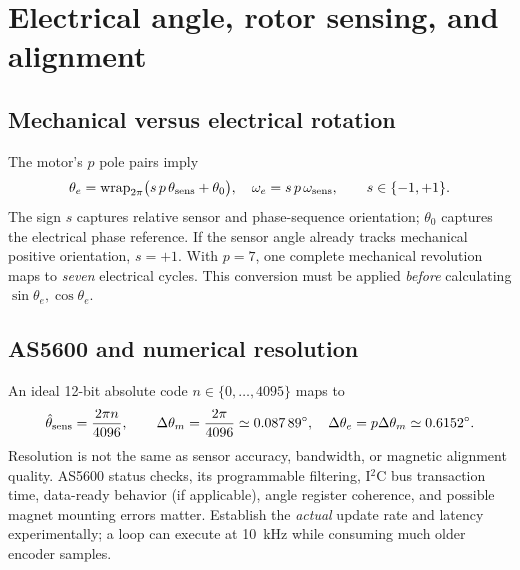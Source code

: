 \documentclass[10pt,letterpaper]{article}
\newcommand{\wrap}{\operatorname{wrap}_{2\pi}}
\begin{document}
\section{Electrical angle, rotor sensing, and alignment}
\subsection{Mechanical versus electrical rotation}
The motor's $p$ pole pairs imply
\begin{equation}\label{eq:angle}
\theta_e=\wrap\bigl(s\,p\,\theta_{\rm sens}+\theta_0\bigr),\quad
\omega_e=s\,p\,\omega_{\rm sens},\qquad s\in\{-1,+1\}.
\end{equation}
The sign $s$ captures relative sensor and phase-sequence orientation; $\theta_0$ captures the electrical phase reference. If the sensor angle already tracks mechanical positive orientation, $s=+1$. With $p=7$, one complete mechanical revolution maps to \emph{seven} electrical cycles. This conversion must be applied \emph{before} calculating $\sin\theta_e,\cos\theta_e$.

\subsection{AS5600 and numerical resolution}
An ideal 12-bit absolute code $n\in\{0,\dots,4095\}$ maps to
\begin{equation}
\hat\theta_{\rm sens}=\frac{2\pi n}{4096},\qquad
\Delta\theta_m=\frac{2\pi}{4096}\simeq\SI{0.08789}{\degree},\quad
\Delta\theta_e=p\Delta\theta_m\simeq\SI{0.6152}{\degree}.
\end{equation}
Resolution is not the same as sensor accuracy, bandwidth, or magnetic alignment quality. AS5600 status checks, its programmable filtering, I$^2$C bus transaction time, data-ready behavior (if applicable), angle register coherence, and possible magnet mounting errors matter. Establish the \emph{actual} update rate and latency experimentally; a loop can execute at \SI{10}{kHz} while consuming much older encoder samples.
\end{document}
